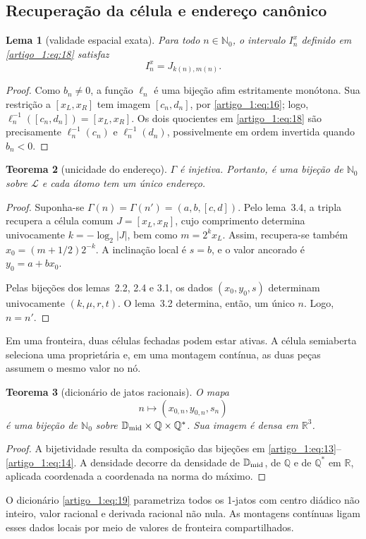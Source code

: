 \documentclass[12pt,a4paper]{article}
\theoremstyle{preciso}
\newtheorem{teorema}{Teorema}[section]
\newtheorem{lema}[teorema]{Lema}
\theoremstyle{definition}
\newcommand{\N}{\mathbb N}
\newcommand{\Q}{\mathbb Q}
\newcommand{\R}{\mathbb R}
\newcommand{\D}{\mathbb D}
\newcommand{\LL}{\mathcal L}
\newcommand{\eqn}[2]{\begin{equation}\label{eq:#1}#2\end{equation}}
\theoremstyle{preciso}
\theoremstyle{preciso}
\theoremstyle{preciso}
\theoremstyle{preciso}
\theoremstyle{definition}
\theoremstyle{preciso}
\theoremstyle{definition}
\theoremstyle{preciso}
\theoremstyle{preciso}
\theoremstyle{definition}
\begin{document}
\subsection{Recuperação da célula e endereço canônico}
\begin{lema}[validade espacial exata]\label{map:artigo_1:3.4}
Para todo $n\in\N_0$, o intervalo $I_n^x$ definido em \eqref{artigo_1:eq:18} satisfaz
\[
I_n^x=J_{k(n),m(n)}.
\]
\end{lema}
\begin{proof}
Como $b_n\ne0$, a função $\ell_n$ é uma bijeção afim estritamente monótona. Sua restrição a $[x_L,x_R]$ tem imagem $[c_n,d_n]$, por \eqref{artigo_1:eq:16}; logo, $\ell_n^{-1}([c_n,d_n])=[x_L,x_R]$. Os dois quocientes em \eqref{artigo_1:eq:18} são precisamente $\ell_n^{-1}(c_n)$ e $\ell_n^{-1}(d_n)$, possivelmente em ordem invertida quando $b_n<0$.
\end{proof}
\begin{teorema}[unicidade do endereço]\label{map:artigo_1:3.5}
$\Gamma$ é injetiva. Portanto, é uma bijeção de $\N_0$ sobre $\LL$ e cada átomo tem um único endereço.
\end{teorema}
\begin{proof}
Suponha-se $\Gamma(n)=\Gamma(n')=(a,b,[c,d])$. Pelo lema~3.4, a tripla recupera a célula comum $J=[x_L,x_R]$, cujo comprimento determina univocamente $k=-\log_2|J|$, bem como $m=2^kx_L$. Assim, recupera-se também $x_0=(m+1/2)2^{-k}$. A inclinação local é $s=b$, e o valor ancorado é $y_0=a+bx_0$.

Pelas bijeções dos lemas~2.2, 2.4 e 3.1, os dados $(x_0,y_0,s)$ determinam univocamente $(k,\mu,r,t)$. O lema~3.2 determina, então, um único $n$. Logo, $n=n'$.
\end{proof}
Em uma fronteira, duas células fechadas podem estar ativas. A célula semiaberta seleciona uma proprietária e, em uma montagem contínua, as duas peças assumem o mesmo valor no nó.
\begin{teorema}[dicionário de jatos racionais]\label{map:artigo_1:3.6}
O mapa
\eqn{19}{n\longmapsto(x_{0,n},y_{0,n},s_n)}
é uma bijeção de $\N_0$ sobre $\D_{\rm mid}\times\Q\times\Q^*$. Sua imagem é densa em $\R^3$.
\end{teorema}
\begin{proof}
A bijetividade resulta da composição das bijeções em \eqref{artigo_1:eq:13}--\eqref{artigo_1:eq:14}. A densidade decorre da densidade de $\D_{\rm mid}$, de $\Q$ e de $\Q^*$ em $\R$, aplicada coordenada a coordenada na norma do máximo.
\end{proof}
O dicionário \eqref{artigo_1:eq:19} parametriza todos os 1-jatos com centro diádico não inteiro, valor racional e derivada racional não nula. As montagens contínuas ligam esses dados locais por meio de valores de fronteira compartilhados.
\end{document}
